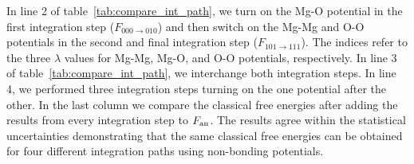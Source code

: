 
In line 2 of table~\ref{tab:compare_int_path}, we turn on the Mg-O
potential in the first integration step ($F_{000 \to 010}$) and then switch
on the Mg-Mg and O-O potentials in the second and final integration step
($F_{101 \to 111}$). The indices refer to the three $\lambda$ values for
Mg-Mg, Mg-O, and O-O potentials, respectively. In line 3 of
table~\ref{tab:compare_int_path}, we interchange both integration steps. In
line 4, we performed three integration steps turning on the one potential
after the other. In the last column we compare the classical free energies
after adding the results from every integration step to $F_{\rm an}$. The
results agree within the statistical uncertainties demonstrating that the
same classical free energies can be obtained for four different integration
paths using non-bonding potentials.

